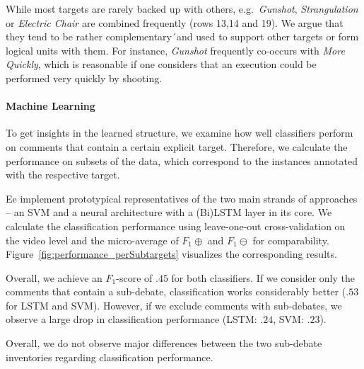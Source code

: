 \documentclass[11pt]{article}
\begin{document}
While most targets are rarely backed up with others, e.g.\ \textit{Gunshot}, \textit{Strangulation} or \textit{Electric Chair} are combined frequently (rows 13,14 and 19). 
We argue that they tend to be rather complementary´and used to support other targets or form logical units with them.
For instance, \textit{Gunshot} frequently co-occurs with \textit{More Quickly}, which is reasonable if one considers that an execution could be performed very quickly by shooting.

\paragraph{Machine Learning}
To get insights in the learned structure, we examine how well classifiers perform on comments that contain a certain explicit target. 
Therefore, we calculate the performance on subsets of the data, which correspond to the instances annotated with the respective target.

Ee implement prototypical representatives of the two main strands of approaches -- an SVM and a neural architecture with a (Bi)LSTM layer in its core. 
We calculate the classification performance using leave-one-out cross-validation on the video level and the micro-average of $F_1\oplus$ and $F_1\ominus$ for comparability.
Figure~\ref{fig:performance_perSubtargets} visualizes the corresponding results.

Overall, we achieve an $F_1$-score of $.45$ for both classifiers.
If we consider only the comments that contain a sub-debate, classification works considerably better ($.53$ for LSTM and SVM).
However, if we exclude comments with sub-debates, we observe a large drop in classification performance (LSTM: $.24$, SVM: $.23$).

Overall, we do not observe major differences between the two sub-debate inventories regarding classification performance.
\end{document}
